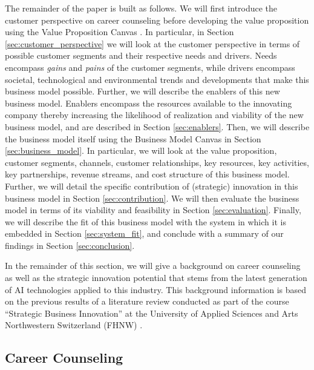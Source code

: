 The remainder of the paper is built as follows. We will first introduce the customer perspective on career counseling
before developing the value proposition using the Value Proposition Canvas \citep{osterwalderValuePropositionDesign2014}.
In particular, in Section \ref{sec:customer_perspective} we will look at the customer perspective in terms of possible
customer segments and their respective needs and drivers. Needs encompass \textit{gains} and \textit{pains} of the
customer segments, while drivers encompass societal, technological and environmental trends and developments that make
this business model possible. Further, we will describe the enablers of this new business model. Enablers encompass 
the resources available to the innovating company thereby increasing the likelihood of realization and viability of the
new business model, and are described in Section \ref{sec:enablers}. Then, we will describe the business model itself
using the Business Model Canvas \citep{osterwalderBusinessModelGeneration2010} in Section \ref{sec:business_model}.
In particular, we will look at the value proposition, customer segments, channels, customer relationships, key
resources, key activities, key partnerships, revenue streams, and cost structure of this business model.
Further, we will detail the specific contribution of (strategic) innovation in this business model in Section
\ref{sec:contribution}. We will then evaluate the business model in terms of its viability and feasibility in Section
\ref{sec:evaluation}. Finally, we will describe the fit of this business model with the system in which it is embedded
in Section \ref{sec:system_fit}, and conclude with a summary of our findings in Section \ref{sec:conclusion}.

In the remainder of this section, we will give a background on career counseling as well as the strategic
innovation potential that stems from the latest generation of AI technologies applied to this industry. This 
background information is based on the previous results of a literature review conducted as part of the course
``Strategic Business Innovation'' at the University of Applied Sciences and Arts Northwestern Switzerland (FHNW)
\citep{kaserAIpoweredCareerCounseling2023}.

\subsection{Career Counseling}

